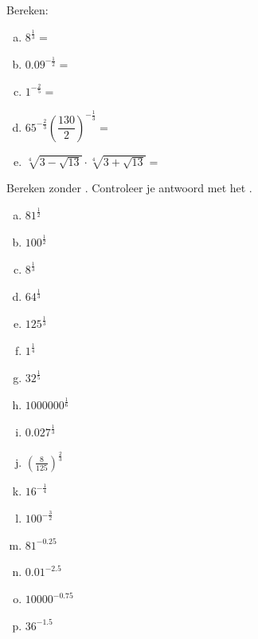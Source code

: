 \documentclass[12pt,twoside]{article}
\begin{document}
\begin{oefening}
Bereken:\\
\begin{enumerate}[(a)]
  \itemsep1.5em
  \item $8^{\frac{1}{3}}=$\arulefill
  \item $0.09^{-\frac{1}{2}}=$\arulefill
  \item $1^{-\frac{2}{5}}=$\arulefill
  \item $65^{-\frac{2}{3}}\left(\dfrac{130}{2}\right)^{-\frac{1}{3}}=$\arulefill
  \item $\sqrt[4]{3-\sqrt{13}}\cdot\sqrt[4]{3+\sqrt{13}}=$\arulefill
\end{enumerate}
\end{oefening}

\begin{oefening}
Bereken zonder . Controleer je antwoord met het .
\begin{multicols}{3}
\begin{enumerate}[(a)]
  \itemsep1em
  \item ${81}^{\frac{1}{2}}$
  \item ${100}^{\frac{1}{2}}$
  \item ${8}^{\frac{1}{3}}$
  \item ${64}^{\frac{1}{3}}$
  \item ${125}^{\frac{1}{3}}$
  \item ${1}^{\frac{1}{4}}$
  \item ${32}^{\frac{1}{5}}$
  \item ${1000000}^{\frac{1}{6}}$
  \item ${0.027}^{\frac{1}{3}}$
  \item $\left(\frac{8}{125}\right)^{\frac{2}{3}}$
  \item ${16}^{-\frac{1}{4}}$
  \item ${100}^{-\frac{3}{2}}$
  \item ${81}^{-0.25}$
  \item ${0.01}^{-2.5}$
  \item ${10000}^{-0.75}$
  \item ${36}^{-1.5}$
\end{enumerate}
\end{multicols}
\end{oefening}
\end{document}
